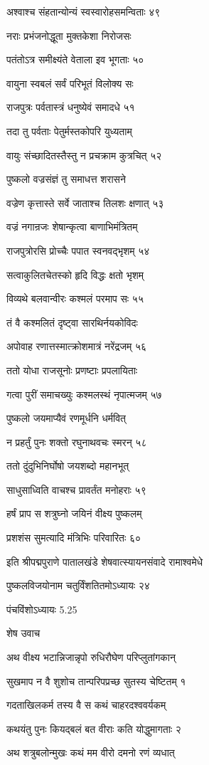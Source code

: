 अश्वाश्च संहतान्योन्यं स्वस्वारोहसमन्विताः ४९

नराः प्रभंजनोद्धूता मुक्तकेशा निरोजसः

पतंतोऽत्र समीक्ष्यंते वेताला इव भूगताः ५०

वायुना स्वबलं सर्वं परिभूतं विलोक्य सः

राजपुत्रः पर्वतास्त्रं धनुष्येवं समादधे ५१

तदा तु पर्वताः पेतुर्मस्तकोपरि युध्यताम्

वायुः संच्छादितस्तैस्तु न प्रचक्राम कुत्रचित् ५२

पुष्कलो वज्रसंज्ञं तु समाधत्त शरासने

वज्रेण कृत्तास्ते सर्वे जाताश्च तिलशः क्षणात् ५३

वज्रं नगान्रजः शेषान्कृत्वा बाणाभिमंत्रितम्

राजपुत्रोरसि प्रोच्चैः पपात स्वनवद्भृशम् ५४

सत्वाकुलितचेतस्को हृदि विद्धः क्षतो भृशम्

विव्यथे बलवान्वीरः कश्मलं परमाप सः ५५

तं वै कश्मलितं दृष्ट्वा सारथिर्नयकोविदः

अपोवाह रणात्तस्मात्क्रोशमात्रं नरेंद्रजम् ५६

ततो योधा राजसूनोः प्रणष्टाः प्रपलायिताः

गत्वा पुरीं समाचख्युः कश्मलस्थं नृपात्मजम् ५७

पुष्कलो जयमाप्यैवं रणमूर्धनि धर्मवित्

न प्रहर्तुं पुनः शक्तो रघुनाथवचः स्मरन् ५८

ततो दुंदुभिनिर्घोषो जयशब्दो महानभूत्

साधुसाध्विति वाचश्च प्रावर्तंत मनोहराः ५९

हर्षं प्राप स शत्रुघ्नो जयिनं वीक्ष्य पुष्कलम्

प्रशशंस सुमत्यादि मंत्रिभिः परिवारितः ६०

इति श्रीपद्मपुराणे पातालखंडे शेषवात्स्यायनसंवादे रामाश्वमेधे

पुष्कलविजयोनाम चतुर्विंशतितमोऽध्यायः २४

पंचविंशोऽध्यायः 5.25

शेष उवाच

अथ वीक्ष्य भटान्निजान्नृपो रुधिरौघेण परिप्लुतांगकान्

सुखमाप न वै शुशोच तान्परिपप्रच्छ सुतस्य चेष्टितम् १

गदताखिलकर्म तस्य वै स कथं चाहरदश्ववर्यकम्

कथयंतु पुनः कियद्बलं बत वीराः कति योद्धुमागताः २

अथ शत्रुबलोन्मुखः कथं मम वीरो दमनो रणं व्यधात्

